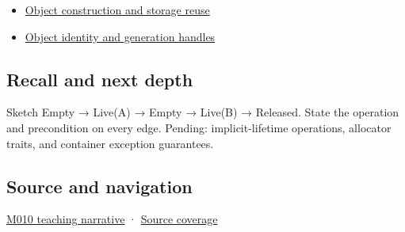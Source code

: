 \begin{itemize}
\tightlist
\item
  \hyperref[appendix-a82f9c438857]{Object construction and storage reuse}
\item
  \hyperref[appendix-f1581457d322]{Object identity and generation handles}
\end{itemize}

\subsection{Recall and next depth}\label{appendix-f56c3e43fd4e-recall-and-next-depth}

Sketch Empty → Live(A) → Empty → Live(B) → Released. State the operation and precondition on every edge. Pending: implicit-lifetime operations, allocator traits, and container exception guarantees.

\subsection{Source and navigation}\label{appendix-f56c3e43fd4e-source-and-navigation}

\hyperref[01-foundations-i-ch004-placement-construction-reuses-storage-it-does-not-allocate-it]{M010 teaching narrative} · \hyperref[appendix-fd090d982a15-m010---parts-148-160]{Source coverage}
